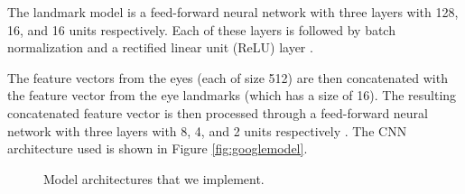 \documentclass{article}
\begin{document}
The landmark model is a feed-forward neural network with three layers with 128, 16, and 16 units respectively. Each of these layers is followed by  batch normalization and a rectified linear unit (ReLU) layer \cite{googlepaper}.

The feature vectors from the eyes (each of size 512) are then concatenated with the feature vector from the eye landmarks (which has a size of 16). The resulting concatenated feature vector is then processed through a feed-forward neural network with three layers with 8, 4, and 2 units respectively \cite{googlepaper}. The CNN architecture used is shown in Figure \ref{fig:googlemodel}.



\begin{figure}[h]
\centering
{}
\qquad
{}
\qquad
{}
\qquad
{}
\caption{Model architectures that we implement.}
\label{fig:architectures}
\end{figure}
\end{document}
